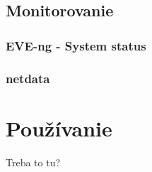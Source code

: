 \subsection{Monitorovanie}

\subsubsection{EVE-ng - System status}

\subsubsection{netdata}

\section{Používanie}

Treba to tu?
